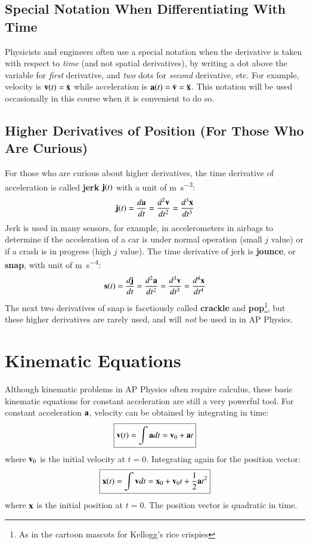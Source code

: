 \documentclass[11pt]{article}
\newcommand{\mb}[1]{\ensuremath\mathbf{#1}}
\begin{document}
\subsection{Special Notation When Differentiating With Time}

Physicists and engineers often use a special notation when the derivative is
taken with respect to \emph{time} (and not spatial derivatives), by writing a
dot above the variable for \emph{first} derivative, and \emph{two} dots for
\emph{second} derivative, etc. For example, velocity is
$\mb{v}(t)=\dot{\mb{x}}$ while acceleration is
$\mb{a}(t)= \dot{\mb{v}}=\ddot{\mb{x}}$. This notation will be used occasionally
in this course when it is convenient to do so.


\subsection{Higher Derivatives of Position (For Those Who Are Curious)}

For those who are curious about higher derivatives, the time derivative of
acceleration is called \textbf{jerk} $\mb{j}(t)$ with a unit of
\si{\metre\per\second^3}:
\begin{equation}
  \mb{j}(t)=\frac{d\mb{a}}{dt}=\frac{d^2\mb{v}}{dt^2}=\frac{d^3\mb{x}}{dt^3}
\end{equation}
Jerk is used in many sensors, for example, in accelerometers in airbags to
determine if the acceleration of a car is under normal operation (small $j$
value) or if a crash is in progress (high $j$ value). The time derivative of
jerk is \textbf{jounce}, or \textbf{snap}, with unit of
\si{\metre\per\second^4}:
\begin{equation}
  \mb{s}(t)=\frac{d\mb{j}}{dt}=\frac{d^2\mb{a}}{dt^2}=\frac{d^3\mb{v}}{dt^3}
  =\frac{d^4\mb{x}}{dt^4}
\end{equation}
The next two derivatives of snap is facetiously called \textbf{crackle} and
\textbf{pop}\footnote{As in the cartoon mascots for Kellogg's rice crispies},
but these higher derivatives are rarely used, and will \emph{not} be used in
in AP Physics.



\section{Kinematic Equations}

Although kinematic problems in AP Physics often require calculus, these basic
kinematic equations for constant acceleration are still a very powerful tool.
For constant acceleration $\mb{a}$, velocity can be obtained by integrating
in time:
\begin{equation}
  \boxed{\mb{v}(t)=\int \mb{a}dt = \mb{v}_0+ \mb{a}t}
  \label{eq:big5-1}
\end{equation}
where $\mb{v}_0$ is the initial velocity at $t=0$. Integrating again for the
position vector:
\begin{equation}
  \boxed{\mb{x}(t)=\int \mb{v}dt=\mb{x}_0+\mb{v}_0t+\frac12 \mb{a}t^2}
  \label{eq:big5-2}
\end{equation}
where $\mb{x}$ is the initial position at $t=0$. The position vector is
quadratic in time.
\end{document}
